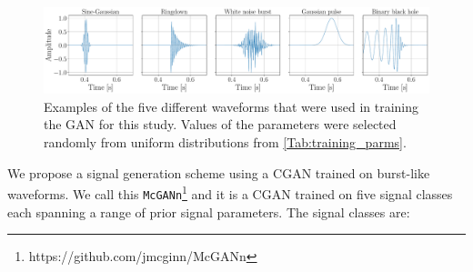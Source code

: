 \documentclass[12pt]{iopart}
\begin{document}
%
\begin{figure}
    \centering
    \includegraphics[width=\textwidth]{figures/training-sample.pdf}
    \caption{Examples of the five different waveforms that were used in training the \ac{GAN} for this study. Values of the parameters were selected randomly from uniform distributions from \cref{Tab:training_parms}.}
    \label{fig:training_waveforms}
\end{figure}
%
We propose a signal generation scheme using a \ac{CGAN} trained on burst-like waveforms. We call this \texttt{McGANn}\footnote{https://github.com/jmcginn/McGANn} and it is a \ac{CGAN} trained on five signal classes each spanning a range of prior signal parameters. The signal classes are:
\end{document}
